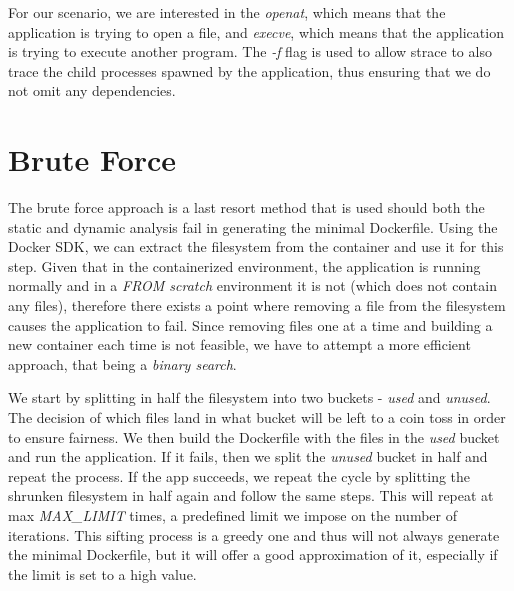 For our scenario, we are interested in the \textit{openat}, which means that the application is trying to open a file, and \textit{execve}, which means that the application is trying to execute another program.
The \textit{-f} flag is used to allow strace to also trace the child processes spawned by the application, thus 
ensuring that we do not omit any dependencies.

\section{Brute Force}
\label{sec:brute-force}

The brute force approach is a last resort method that is used should both the static and dynamic analysis fail in generating the minimal Dockerfile.
Using the Docker SDK, we can extract the filesystem from the container and use it for this step. Given that in the containerized environment, the application is
running normally and in a \textit{FROM scratch} environment it is not (which does not contain any files), therefore there exists a point where removing a file from the filesystem causes
the application to fail. Since removing files one at a time and building a new container each time is not feasible, we have to attempt a more efficient approach, that being a \textit{binary search}.


We start by splitting in half the filesystem into two buckets - \textit{used} and \textit{unused}. The decision of which files land in what bucket will be 
left to a coin toss in order to ensure fairness. We then build the Dockerfile with the files in the \textit{used} bucket and run the application. If it fails, then we split the \textit{unused} bucket in half and repeat the process.
If the app succeeds, we repeat the cycle by splitting the shrunken filesystem in half again and follow the same steps. This will repeat at max \textit{MAX_LIMIT} times, a predefined limit we impose on the number of iterations.
This sifting process is a greedy one and thus will not always generate the minimal Dockerfile, but it will offer a good approximation of it, especially if the limit is set to a high value.
